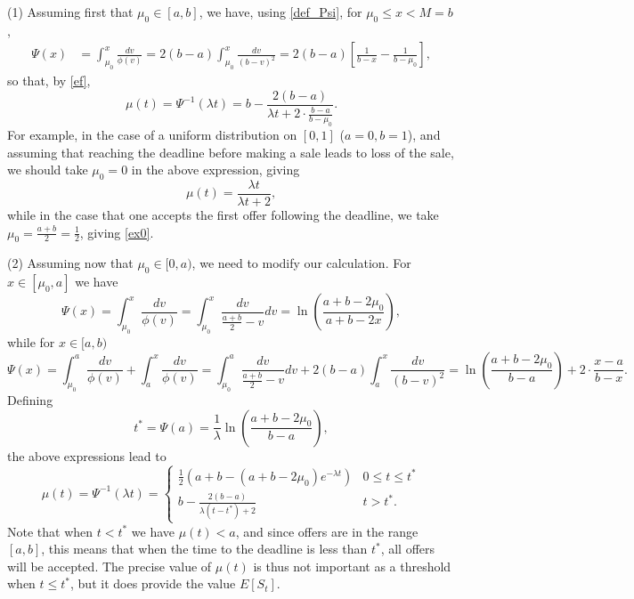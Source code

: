 \documentclass{article}
\numberwithin{equation}{section}
\begin{document}
	(1) Assuming first that $\mu_0\in [a,b]$, we have, using \eqref{def_Psi}, for $\mu_0\leq x< M=b$,
	\begin{align*}\Psi(x)&=\int_{\mu_0}^x \frac{dv}{\phi(v)}
		=2(b-a)\int_{\mu_0}^x \frac{dv}{(b-v)^2}
		=2(b-a)\left[\frac{1}{b-x}-\frac{1}{b-\mu_0} \right],
	\end{align*}
	so that, by \eqref{ef},
	\begin{equation}\label{mu_uniform_g}
		\mu(t)=\Psi^{-1}(\lambda t)=b-\frac{2(b-a)}{\lambda t+2\cdot \frac{b-a}{b-\mu_0}}.
	\end{equation}
	For example, in the case of a uniform distribution on $[0,1]$ ($a=0,b=1$), and assuming that reaching the deadline
	before making a sale leads to loss of the sale, we should take $\mu_0=0$ in the above expression, giving
	$$\mu(t)=\frac{\lambda t}{\lambda t+2},$$
	while in the case 
	that one accepts the first offer 
	following the deadline, we take $\mu_0=\frac{a+b}{2}=\frac{1}{2}$,
	giving \eqref{ex0}.
	
	(2) Assuming now that $\mu_0\in [0,a)$, we need to modify our calculation. For 
	$x\in [\mu_0,a]$ we have
	$$\Psi(x)=\int_{\mu_0}^x \frac{dv}{\phi(v)}=\int_{\mu_0}^x \frac{dv}{\frac{a+b}{2}-v}dv=\ln\left(\frac{a+b-2\mu_0}{a+b-2x} \right),$$
	while for $x\in [a,b)$
	$$\Psi(x)=\int_{\mu_0}^a \frac{dv}{\phi(v)}+\int_{a}^x \frac{dv}{\phi(v)}=\int_{\mu_0}^a \frac{dv}{\frac{a+b}{2}-v}dv+2(b-a)\int_{a}^x \frac{dv}{(b-v)^2}=\ln\left(\frac{a+b-2\mu_0}{b-a} \right)+2\cdot\frac{x-a}{b-x}.$$
	Defining
	$$t^*=\Psi(a)=\frac{1}{\lambda}\ln\left(\frac{a+b-2\mu_0}{b-a} \right),$$
	the above expressions lead to
	\begin{equation}\label{mu_uniform_g1}\mu(t)=\Psi^{-1}(\lambda t)=\begin{cases}
			\frac{1}{2}(a+b-(a+b-2\mu_0)e^{-\lambda t}) & 0\leq t\leq t^*\\
			b-\frac{2(b-a)}{\lambda (t-t^*)+2}   & t>t^*.
	\end{cases}\end{equation}
	Note that when $t<t^*$ we have 
	$\mu(t)<a$, and since offers are in the range $[a,b]$, this means that when the time to the deadline is less than $t^*$, all offers will be accepted. The precise 
	value of $\mu(t)$ is thus not important
	as a threshold when $t\leq t^*$, but it does provide the value $E[S_t]$.
	
\end{document}
